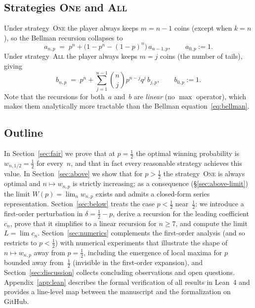 \documentclass[12pt]{article}
\theoremstyle{definition}
\theoremstyle{remark}
\newcommand{\One}{\textsc{One}}
\newcommand{\All}{\textsc{All}}
\begin{document}
\subsection{Strategies \One{} and \All}

Under strategy~\One{} the player always keeps $m=n-1$ coins
(except when $k=n$), so the Bellman recursion collapses to
\begin{equation}\label{eq:a-rec}
  a_{n,p} \;=\; p^n + \bigl(1-p^n-(1-p)^n\bigr)\,a_{n-1,p},
  \qquad a_{0,p}:=1.
\end{equation}
Under strategy~\All{} the player always keeps $m=j$ coins (the
number of tails), giving
\begin{equation}\label{eq:b-rec}
  b_{n,p} \;=\; p^n + \sum_{j=1}^{n-1}\binom{n}{j}p^{n-j}q^{j}\,
  b_{j,p},
  \qquad b_{0,p}:=1.
\end{equation}
Note that the recursions for both~$a$ and~$b$ are \emph{linear}
(no $\max$ operator), which makes them analytically more tractable
than the Bellman equation~\eqref{eq:bellman}.

\subsection{Outline}

In Section~\ref{sec:fair} we prove that at $p=\tfrac12$ the optimal
winning probability is $w_{n,1/2}=\tfrac12$ for every~$n$, and that
in fact every reasonable strategy achieves this value.  In
Section~\ref{sec:above} we show that for $p>\tfrac12$ the
strategy~\One{} is always optimal and $n\mapsto w_{n,p}$ is strictly
increasing; as a consequence (\S\ref{sec:above-limit}) the limit
$W(p)=\lim_n w_{n,p}$ exists and admits a closed-form series
representation.  Section~\ref{sec:below} treats the case
$p<\tfrac12$ near~$\tfrac12$: we introduce a first-order
perturbation in $\delta=\tfrac12-p$, derive a recursion for the
leading coefficient~$c_n$, prove that it simplifies to a linear
recursion for $n\ge 7$, and compute the limit $L=\lim c_n$.
Section~\ref{sec:numerics} complements the first-order analysis
(and so restricts to $p<\tfrac12$) with numerical experiments that
illustrate the shape of $n\mapsto w_{n,p}$ away from $p=\tfrac12$,
including the emergence of local maxima for $p$ bounded away
from~$\tfrac12$ (invisible in the first-order expansion), and
Section~\ref{sec:discussion}
collects concluding observations and open questions.
Appendix~\ref{app:lean}
describes the formal verification of all results in Lean~4 and
provides a line-level map between the manuscript and the
formalization on GitHub.
\end{document}
